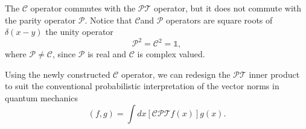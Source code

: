 \documentclass[12pt, a4paper]{report}
\newcommand\PT{\(\mathcal{PT}\)}
\newcommand\PP{\(\mathcal{P}\)}
\newcommand\CC{\(\mathcal{C}\)}
\begin{document}
The \CC\: operator commutes with the \PT\: operator, but it does not commute with the parity operator \PP. Notice that \CC\:and \PP\: operators are square roots of $\delta(x-y)$ the unity operator\cite{ComplexExtension}
\begin{equation}\label{eq:2.10}
\mathcal{P}^2 = \mathcal{C}^2 = \mathds{1}, 
\end{equation}
where $\mathcal{P} \neq \mathcal{C}$, since \PP\: is real and \CC\: is complex valued\cite{MustaHbeHermitian}\cite{Bender_2004}.

Using the newly constructed \CC\: operator, we can redesign the \PT\: inner product to suit the conventional probabilistic interpretation of the vector norms in quantum mechanics
\begin{equation}\label{eq:2.11}
\left( f, g \right ) = \int dx \left [ \mathcal{CPT} f(x) \right ] g(x).
\end{equation}
\end{document}
